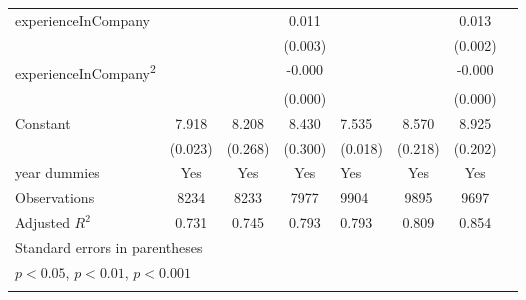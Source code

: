 {\begin{longtable}{l*{3}{c}|l*{3}{c}}
		experienceInCompany &                     &                     &       0.011\sym{***}&                     &                     &       0.013\sym{***}\\
		&                     &                     &     (0.003)         &                     &                     &     (0.002)         \\
		experienceInCompany\textsuperscript{2}&                     &                     &      -0.000\sym{*}  &                     &                     &      -0.000\sym{***}\\
		&                     &                     &     (0.000)         &                     &                     &     (0.000)         \\
		Constant            &       7.918\sym{***}&       8.208\sym{***}&       8.430\sym{***}&       7.535\sym{***}&       8.570\sym{***}&       8.925\sym{***}\\
		&     (0.023)         &     (0.268)         &     (0.300)         &     (0.018)         &     (0.218)         &     (0.202)         \\
		year dummies        &         Yes         &         Yes         &         Yes         &         Yes         &         Yes         &         Yes         \\
		\midrule
		Observations        &        8234         &        8233         &        7977         &        9904         &        9895         &        9697         \\
		Adjusted \(R^{2}\)  &       0.731         &       0.745         &       0.793         &       0.793         &       0.809         &       0.854         \\
		\bottomrule
		\multicolumn{7}{l}{\footnotesize Standard errors in parentheses}\\
		\multicolumn{7}{l}{\footnotesize \sym{*} \(p<0.05\),
          \sym{**} \(p<0.01\), \sym{***} \(p<0.001\)}\\
          \label{tab:ru_wage_full}
	\end{longtable}
}
